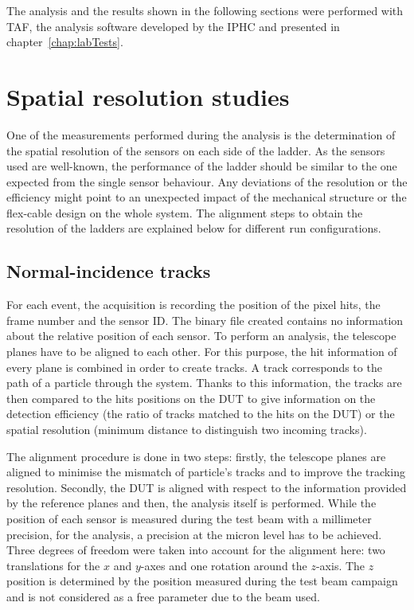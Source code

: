     The analysis and the results shown in the following sections were performed with \gls{TAF}, the analysis software developed by the \gls{IPHC} and presented in chapter~\ref{chap:labTests}.

  \section{Spatial resolution studies}
   
    One of the measurements performed during the analysis is the determination of the spatial resolution of the sensors on each side of the ladder.
    As the sensors used are well-known, the performance of the ladder should be similar to the one expected from the single sensor behaviour.
    Any deviations of the resolution or the efficiency might point to an unexpected impact of the mechanical structure or the flex-cable design on the whole system.
    The alignment steps to obtain the resolution of the ladders are explained below for different run configurations. 

    \subsection{Normal-incidence tracks}
     
    For each event, the acquisition is recording the position of the pixel hits, the frame number and the sensor ID.
    The binary file created contains no information about the relative position of each sensor.
    To perform an analysis, the telescope planes have to be aligned to each other.
    For this purpose, the hit information of every plane is combined in order to create tracks. 
    A track corresponds to the path of a particle through the system.
    Thanks to this information, the tracks are then compared to the hits positions on the \gls{DUT} to give information on the detection efficiency (the ratio of tracks matched to the hits on the \gls{DUT}) or the spatial resolution (minimum distance to distinguish two incoming tracks).

    The alignment procedure is done in two steps: firstly, the telescope planes are aligned to minimise the mismatch of particle's tracks and to improve the tracking resolution.
    Secondly, the \gls{DUT} is aligned with respect to the information provided by the reference planes and then, the analysis itself is performed.
    While the position of each sensor is measured during the test beam with a millimeter precision, for the analysis, a precision at the micron level has to be achieved.
    Three degrees of freedom were taken into account for the alignment here: two translations for the $x$ and $y$-axes and one rotation around the $z$-axis.
    The $z$ position is determined by the position measured during the test beam campaign and is not considered as a free parameter due to the beam used.

